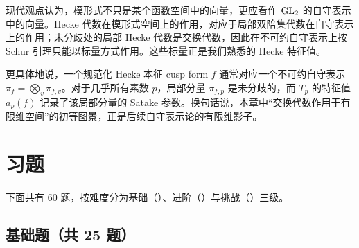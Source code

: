 \begin{remark}[与自守表示的联系：预告]
现代观点认为，模形式不只是某个函数空间中的向量，更应看作 $\mathrm{GL}_2$ 的自守表示中的向量。Hecke 代数在模形式空间上的作用，对应于局部双陪集代数在自守表示上的作用；未分歧处的局部 Hecke 代数是交换代数，因此在不可约自守表示上按 Schur 引理只能以标量方式作用。这些标量正是我们熟悉的 Hecke 特征值。

更具体地说，一个规范化 Hecke 本征 cusp form $f$ 通常对应一个不可约自守表示 $\pi_f=\bigotimes_v \pi_{f,v}$。对于几乎所有素数 $p$，局部分量 $\pi_{f,p}$ 是未分歧的，而 $T_p$ 的特征值 $a_p(f)$ 记录了该局部分量的 Satake 参数。换句话说，本章中“交换代数作用于有限维空间”的初等图景，正是后续自守表示论的有限维影子。
\end{remark}

\section*{习题}

下面共有 $60$ 题，按难度分为基础（\basic）、进阶（\medium）与挑战（\hard）三级。

\subsection*{基础题（共 25 题）}

